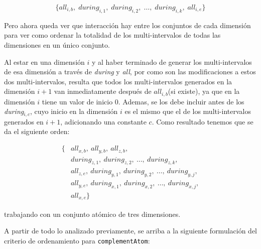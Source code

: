 \[
\{\textit{all}_{i,b},\;\textit{during}_{i,1},\;\textit{during}_{i,2},\;\dots,\;\textit{during}_{i,k},\;\textit{all}_{i,e}\}
\]

Pero ahora queda ver que interacción hay entre los conjuntos de cada dimensión para ver como ordenar la totalidad de los multi-intervalos de todas las dimensiones en un único conjunto.

Al estar en una dimensión $i$ y al haber terminado de generar los multi-intervalos de esa dimensión a través de \textit{during} y \textit{all}, por como son las modificaciones a estos dos multi-intervalos, resulta que todos los multi-intervalos generados en la dimensión $i+1$ van inmediatamente después de $all_{i,b}$(si existe), ya que en la dimensión $i$ tiene un valor de inicio $0$. Ademas, se los debe incluir antes de los \textit{during}$_{i,c}$, cuyo inicio en la dimensión $i$ es el mismo que el de los multi-intervalos generados en $i+1$, adicionando una constante $c$. Como resultado tenemos que se da el siguiente orden:

\begin{align*}
\{ &\textit{all}_{x,b},\ \textit{all}_{y,b},\ \textit{all}_{z,b}, \\
   &\textit{during}_{z,1},\ \textit{during}_{z,2},\ \dots,\ \textit{during}_{z,k}, \\
   &\textit{all}_{z,e},\ \textit{during}_{y,1},\ \textit{during}_{y,2},\ \dots,\ \textit{during}_{y,j}, \\
   &\textit{all}_{y,e},\ \textit{during}_{x,1},\ \textit{during}_{x,2},\ \dots,\ \textit{during}_{x,j}, \\
   &\textit{all}_{x,e} \}
\end{align*}

trabajando con un conjunto atómico de tres dimensiones.

A partir de todo lo analizado previamente, se arriba a la siguiente formulación del criterio de ordenamiento para \texttt{complementAtom}:

